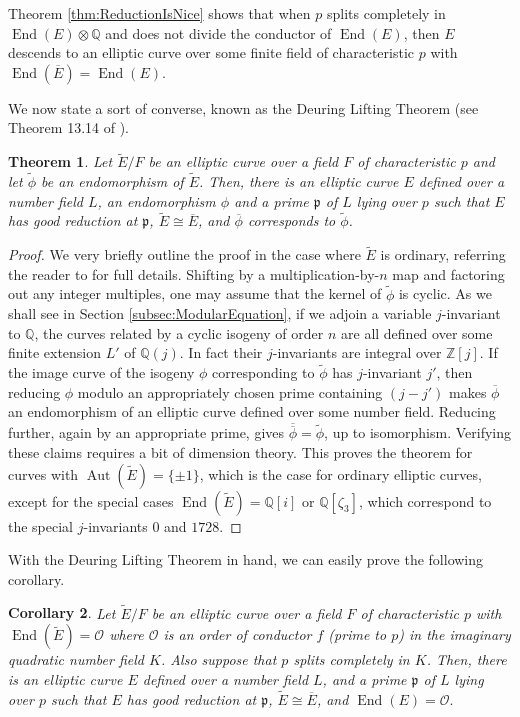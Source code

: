 \documentclass{amsart}
\newtheorem{thm}{Theorem}[section]
\newtheorem{cor}[thm]{Corollary}
\theoremstyle{definition}
\theoremstyle{remark}
\numberwithin{equation}{section}
\newcommand{\cO}{\mathcal O}
\newcommand{\fkp}{\mathfrak p}
\newcommand{\bbQ}{\mathbb Q}
\newcommand{\bbZ}{\mathbb Z}
\DeclareMathOperator{\Aut}{Aut}
\DeclareMathOperator{\End}{End}
\begin{document}
Theorem \ref{thm:ReductionIsNice} shows that when $p$ splits completely in $\End(E) \otimes \bbQ$ and does not divide the conductor of $\End(E)$, then $E$ descends to an elliptic curve over some finite field of characteristic $p$ with $\End(\overline{E}) = \End(E)$.

We now state a sort of converse, known as the Deuring Lifting Theorem (see Theorem 13.14 of \cite{LangEF}).

\begin{thm} \label{thm:DeuringLiftingTheorem}
Let $\tilde{E}/F$ be an elliptic curve over a field $F$ of characteristic $p$ and let $\tilde{\phi}$ be an endomorphism of $\tilde{E}$. Then, there is an elliptic curve $E$ defined over a number field $L$, an endomorphism $\phi$ and a prime $\fkp$ of $L$ lying over $p$ such that $E$ has good reduction at $\fkp$, $\tilde{E} \cong \overline{E}$, and $\overline{\phi}$ corresponds to $\tilde{\phi}$.
\end{thm}

\begin{proof}
We very briefly outline the proof in the case where $\tilde{E}$ is ordinary, referring the reader to \cite{LangEF} for full details. Shifting by a multiplication-by-$n$ map and factoring out any integer multiples, one may assume that the kernel of $\tilde{\phi}$ is cyclic. 
As we shall see in Section \ref{subsec:ModularEquation},
if we adjoin a variable $j$-invariant to $\bbQ$, the curves related by a cyclic isogeny of order $n$ are all defined over some finite extension $L'$ of $\bbQ(j)$. In fact their $j$-invariants are integral over $\bbZ[j]$. If the image curve of the isogeny $\phi$ corresponding to $\tilde{\phi}$ has $j$-invariant $j'$, then reducing $\phi$ modulo an appropriately chosen prime containing $(j - j')$ makes $\overline{\phi}$ an endomorphism of an elliptic curve defined over some number field.  Reducing further, again by an appropriate prime, gives $\overline{\overline{\phi}} = \tilde{\phi}$, up to isomorphism. Verifying these claims requires a bit of dimension theory. This proves the theorem for curves with $\Aut(\tilde{E}) = \{\pm 1\}$, which is the case for ordinary elliptic curves, except for the special cases $\End(\tilde{E}) = \bbQ[i]$ or $\bbQ[\zeta_{3}]$, which correspond to the special $j$-invariants $0$ and $1728$.
\end{proof}

 With the Deuring Lifting Theorem in hand, we can easily prove the following corollary.
 
 \begin{cor}\label{cor:DeuringLiftingCorollary}
Let $\tilde{E}/F$ be an elliptic curve over a field $F$ of characteristic $p$ with $\End(\tilde{E}) = \cO$ where $\cO$ is an order of conductor $f$ (prime to $p$) in the imaginary quadratic number field $K$. Also suppose that $p$ splits completely in $K$. Then, there is an elliptic curve $E$ defined over a number field $L$, and a prime $\fkp$ of $L$ lying over $p$ such that $E$ has good reduction at $\fkp$, $\tilde{E} \cong \overline{E}$, and $\End(E) = \cO.$
\end{cor}
\end{document}
